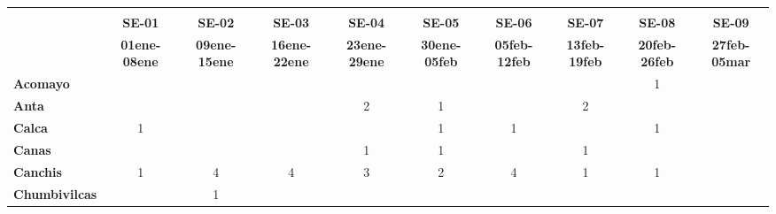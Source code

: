 \begin{tabular}{lccccccccc}
	\textbf{}              & \multicolumn{1}{l}{}                        & \multicolumn{1}{l}{}      & \multicolumn{1}{l}{}                         & \multicolumn{1}{l}{}                         & \multicolumn{1}{l}{}                         & \multicolumn{1}{l}{}                        & \multicolumn{1}{l}{}                         & \multicolumn{1}{l}{}                         & \multicolumn{1}{l}{}     \\
	\textbf{}                                                                               
	&\textbf{SE-01}								&\textbf{SE-02}				&\textbf{SE-03}
	&\textbf{SE-04}								&\textbf{SE-05}	
	&\textbf{SE-06}								&\textbf{SE-07}				&\textbf{SE-08}
	&\textbf{SE-09}\\
	\textbf{}              	  	
	&\textbf{01ene-08ene}				&\textbf{09ene-15ene}						&\textbf{16ene-22ene}				&\textbf{23ene-29ene}						&\textbf{30ene-05feb}
	&\textbf{05feb-12feb}				&\textbf{13feb-19feb}
	&\textbf{20feb-26feb}				&\textbf{27feb-05mar}\\
	\textbf{Acomayo}                        	
	&\cellcolor[HTML]{FCC46C} 					&\cellcolor[HTML]{FCC46C} 	    			&\cellcolor[HTML]{FCC46C}				    &\cellcolor[HTML]{FCC46C}
	&\cellcolor[HTML]{FCC46C}					&\cellcolor[HTML]{FCC46C}
	&\cellcolor[HTML]{FCC46C}					&1
	&\cellcolor[HTML]{FCC46C}\\
	\textbf{Anta}                                                          					
	&\cellcolor[HTML]{FCC46C}					&\cellcolor[HTML]{FCC46C}
	&\cellcolor[HTML]{FCC46C}					&2 				
	&1
	&\cellcolor[HTML]{FCC46C}					&2
	&\cellcolor[HTML]{FCC46C}
	&\cellcolor[HTML]{FCC46C}\\
	\textbf{Calca}      				       								            
	&1											&\cellcolor[HTML]{FCC46C}	&\cellcolor[HTML]{FCC46C}					&\cellcolor[HTML]{FCC46C}
	&1 											&1	&\cellcolor[HTML]{FCC46C}			&1											&\cellcolor[HTML]{FCC46C} \\                										
	\textbf{Canas}                              
	&\cellcolor[HTML]{FCC46C}					&\cellcolor[HTML]{FCC46C} 		
	&\cellcolor[HTML]{FCC46C}					&1
	&1											&\cellcolor[HTML]{FCC46C}
	&1											&\cellcolor[HTML]{FCC46C}
	&\cellcolor[HTML]{FCC46C}\\
	\textbf{Canchis}                             		
	&1											&4
	&4											&3
	&2											&4
	&1											&1
	&\cellcolor[HTML]{FCC46C}\\
	\textbf{Chumbivilcas}                      			
	&\cellcolor[HTML]{FCC46C}					&1

\end{tabular}
